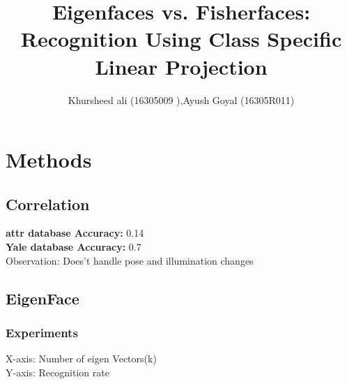 \documentclass[a4paper,10pt]{report}
\title{Eigenfaces vs. Fisherfaces: Recognition Using Class Specific Linear Projection}
\author{Khursheed ali (16305009 ),Ayush Goyal (16305R011)}
\begin{document}
\maketitle


\chapter{Methods}

\section{Correlation}
\textbf{attr database Accuracy:} 0.14 \\
\textbf{Yale database Accuracy:} 0.7 \\ 
Observation: Does't handle pose and illumination changes \\

\section{EigenFace}

\subsection{Experiments}
X-axis: Number of eigen Vectors(k)\\
Y-axis: Recognition rate
\newpage
\end{document}
